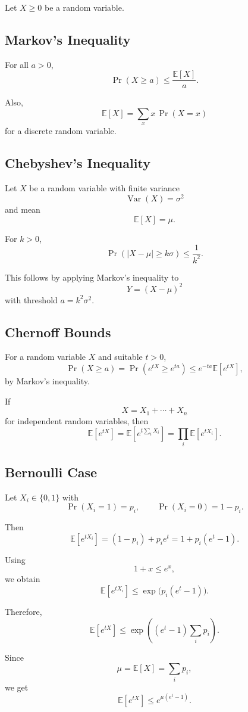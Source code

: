 \documentclass[11pt]{article}
\newcommand{\Prob}{\operatorname{Pr}}
\newcommand{\E}{\mathbb{E}}
\newcommand{\Var}{\operatorname{Var}}
\begin{document}
Let $X\ge 0$ be a random variable.

\subsection{Markov's Inequality}

For all $a>0$,
\[
  \Prob(X\ge a)
  \le
  \frac{\E[X]}{a}.
\]

Also,
\[
  \E[X]=\sum_x x\,\Prob(X=x)
\]
for a discrete random variable.

\subsection{Chebyshev's Inequality}

Let $X$ be a random variable with finite variance
\[
  \Var(X)=\sigma^2
\]
and mean
\[
  \E[X]=\mu.
\]

For $k>0$,
\[
  \Prob\!\left(|X-\mu|\ge k\sigma\right)
  \le
  \frac{1}{k^2}.
\]

This follows by applying Markov's inequality to
\[
  Y=(X-\mu)^2
\]
with threshold $a=k^2\sigma^2$.

\subsection{Chernoff Bounds}

For a random variable $X$ and suitable $t>0$,
\[
  \Prob(X\ge a)
  =
  \Prob(e^{tX}\ge e^{ta})
  \le
  e^{-ta}\E[e^{tX}],
\]
by Markov's inequality.

If
\[
  X=X_1+\cdots+X_n
\]
for independent random variables, then
\[
  \E[e^{tX}]
  =
  \E\!\left[e^{t\sum_iX_i}\right]
  =
  \prod_i \E[e^{tX_i}].
\]

\subsection{Bernoulli Case}

Let $X_i\in\{0,1\}$ with
\[
  \Prob(X_i=1)=p_i,
  \qquad
  \Prob(X_i=0)=1-p_i.
\]

Then
\[
  \E[e^{tX_i}]
  =
  (1-p_i)+p_i e^t
  =
  1+p_i(e^t-1).
\]

Using
\[
  1+x\le e^x,
\]
we obtain
\[
  \E[e^{tX_i}]
  \le
  \exp\!\bigl(p_i(e^t-1)\bigr).
\]

Therefore,
\[
  \E[e^{tX}]
  \le
  \exp\!\left((e^t-1)\sum_i p_i\right).
\]

Since
\[
  \mu=\E[X]=\sum_i p_i,
\]
we get
\[
  \E[e^{tX}]
  \le
  e^{\mu(e^t-1)}.
\]
\end{document}
